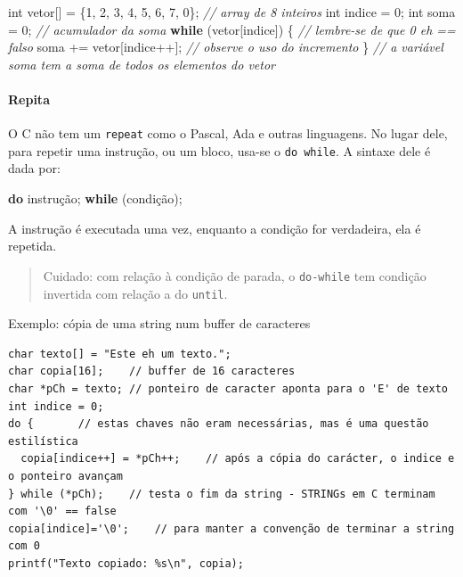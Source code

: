 \documentclass[
]{article}
\newenvironment{Shaded}{}{}
\newcommand{\CommentTok}[1]{\textcolor[rgb]{0.38,0.63,0.69}{\textit{#1}}}
\newcommand{\ControlFlowTok}[1]{\textcolor[rgb]{0.00,0.44,0.13}{\textbf{#1}}}
\newcommand{\DataTypeTok}[1]{\textcolor[rgb]{0.56,0.13,0.00}{#1}}
\newcommand{\DecValTok}[1]{\textcolor[rgb]{0.25,0.63,0.44}{#1}}
\newcommand{\NormalTok}[1]{#1}
\begin{document}
\begin{Shaded}
\begin{Highlighting}[]
\DataTypeTok{int}\NormalTok{ vetor[] = \{}\DecValTok{1}\NormalTok{, }\DecValTok{2}\NormalTok{, }\DecValTok{3}\NormalTok{, }\DecValTok{4}\NormalTok{, }\DecValTok{5}\NormalTok{, }\DecValTok{6}\NormalTok{, }\DecValTok{7}\NormalTok{, }\DecValTok{0}\NormalTok{\};    }\CommentTok{// array de 8 inteiros}
\DataTypeTok{int}\NormalTok{ indice = }\DecValTok{0}\NormalTok{;}
\DataTypeTok{int}\NormalTok{ soma = }\DecValTok{0}\NormalTok{;                              }\CommentTok{// acumulador da soma}
\ControlFlowTok{while}\NormalTok{ (vetor[indice]) \{      }\CommentTok{// lembre-se de que 0 eh == falso}
\NormalTok{  soma += vetor[indice++];   }\CommentTok{// observe o uso do incremento}
\NormalTok{\}}
\CommentTok{// a variável soma tem a soma de todos os elementos do vetor}
\end{Highlighting}
\end{Shaded}

\hypertarget{repita}{%
\paragraph{Repita}\label{repita}}

O C não tem um \texttt{repeat} como o Pascal, Ada e outras linguagens.
No lugar dele, para repetir uma instrução, ou um bloco, usa-se o
\texttt{do\ while}. A sintaxe dele é dada por:

\begin{Shaded}
\begin{Highlighting}[]
\ControlFlowTok{do}\NormalTok{ instrução; }\ControlFlowTok{while}\NormalTok{ (condição);}
\end{Highlighting}
\end{Shaded}

A instrução é executada uma vez, enquanto a condição for verdadeira, ela
é repetida.

\begin{quote}
Cuidado: com relação à condição de parada, o \texttt{do-while} tem
condição invertida com relação a do \texttt{until}.
\end{quote}

Exemplo: cópia de uma string num buffer de caracteres

\begin{verbatim}
char texto[] = "Este eh um texto.";
char copia[16];    // buffer de 16 caracteres
char *pCh = texto; // ponteiro de caracter aponta para o 'E' de texto
int indice = 0;
do {       // estas chaves não eram necessárias, mas é uma questão estilística
  copia[indice++] = *pCh++;    // após a cópia do carácter, o indice e o ponteiro avançam
} while (*pCh);    // testa o fim da string - STRINGs em C terminam com '\0' == false
copia[indice]='\0';    // para manter a convenção de terminar a string com 0
printf("Texto copiado: %s\n", copia);
\end{verbatim}
\end{document}
